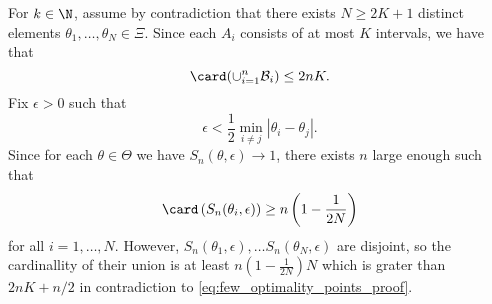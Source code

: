 For $k\in \N$, assume by contradiction that there exists $N \geq 2K + 1$ distinct elements
$\theta_1,\ldots,\theta_N \in \Xi$. Since each $A_i$ consists of at most $K$ intervals, we have that 
\begin{equation}
\label{eq:few_optimality_points_proof}
\card (\cup_{i=1}^n \mathcal B_i) \leq 2 n K. 
\end{equation}
Fix $\epsilon>0$ such that 
\[
\epsilon < \frac{1}{2}\min_{i\neq j} |\theta_i - \theta_j|. 
\]
Since for each $\theta \in \Theta$ we have $S_n(\theta, \epsilon) \to 1$, there exists $n$ large enough such that 
\[
\card \left(S_n(\theta_i, \epsilon) \right) \geq n \left(1-\frac{1}{2N} \right)
\]
for all $i=1,\ldots,N$. However, $S_n(\theta_1,\epsilon), \ldots S_n(\theta_N,\epsilon)$ are disjoint, so the cardinallity of their union is at least $n\left(1-\frac{1}{2N} \right)N$ which is grater than $2nK + n/2$ in contradiction to \eqref{eq:few_optimality_points_proof}. 

